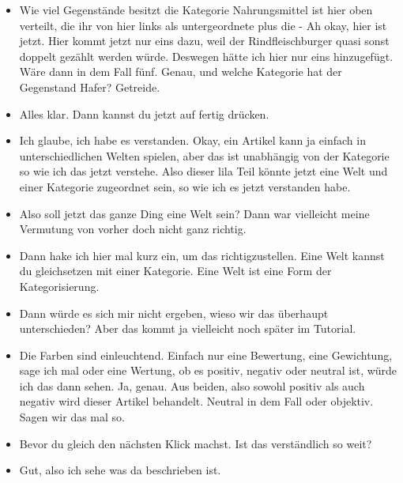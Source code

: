 {\begin{itemize}[]
                  Also wären das in dem Fall jetzt vier untergeordnete.
                  Deswegen würde ich da jetzt eine vier einfügen.
            \item {} Wie viel Gegenstände besitzt die Kategorie Nahrungsmittel ist hier oben verteilt, die ihr von hier links als untergeordnete plus die - Ah okay, hier ist jetzt.
                  Hier kommt jetzt nur eins dazu, weil der Rindfleischburger quasi sonst doppelt gezählt werden würde.
                  Deswegen hätte ich hier nur eins hinzugefügt.
                  Wäre dann in dem Fall fünf.
                  Genau, und welche Kategorie hat der Gegenstand Hafer?
                  Getreide.
            \item {} Alles klar.
                  Dann kannst du jetzt auf fertig drücken.
            \item {} Ich glaube, ich habe es verstanden.
                  Okay, ein Artikel kann ja einfach in unterschiedlichen Welten spielen, aber das ist unabhängig von der Kategorie so wie ich das jetzt verstehe.
                  Also dieser lila Teil könnte jetzt eine Welt und einer Kategorie zugeordnet sein, so wie ich es jetzt verstanden habe.
            \item {} Also soll jetzt das ganze Ding eine Welt sein?
                  Dann war vielleicht meine Vermutung von vorher doch nicht ganz richtig.
            \item {} Dann hake ich hier mal kurz ein, um das richtigzustellen.
                  Eine Welt kannst du gleichsetzen mit einer Kategorie.
                  Eine Welt ist eine Form der Kategorisierung.
            \item {} Dann würde es sich mir nicht ergeben, wieso wir das überhaupt unterschieden?
                  Aber das kommt ja vielleicht noch später im Tutorial.
            \item {} Die Farben sind einleuchtend.
                  Einfach nur eine Bewertung, eine Gewichtung, sage ich mal oder eine Wertung, ob es positiv, negativ oder neutral ist, würde ich das dann sehen.
                  Ja, genau.
                  Aus beiden, also sowohl positiv als auch negativ wird dieser Artikel behandelt.
                  Neutral in dem Fall oder objektiv.
                  Sagen wir das mal so.
            \item {} Bevor du gleich den nächsten Klick machst.
                  Ist das verständlich so weit?
            \item {} Gut, also ich sehe was da beschrieben ist.

\end{itemize}}

